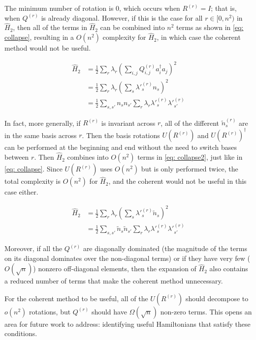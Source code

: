 The minimum number of rotation is $0$, which occurs when $R^{(r)} = I$; that is, when $Q^{(r)}$ is already diagonal. However, if this is the case for all $r \in [0, n^2)$ in $\hat{H}_2$, then all of the terms in $\hat{H}_2$ can be combined into $n^2$ terms as shown in \eqref{eq: collapse}, resulting in a $O(n^2)$ complexity for $\hat{H}_2$, in which case the coherent method would not be useful.

\begin{equation}
    \begin{split}
        \hat{H}_2 &= \frac{1}{2}\sum_r\lambda_r\left(\sum_{i,j} Q^{(r)}_{i, j}a^\dag_ia_j\right)^2 \\
        &= \frac{1}{2}\sum_r\lambda_r(\sum_{s} \lambda'^{(r)}_sn_s)^2 \\
        &= \frac{1}{2}\sum_{s, s'} n_sn_{s'}\sum_r\lambda_r\lambda'^{(r)}_s\lambda'^{(r)}_{s'}
    \end{split}
    \label{eq: collapse}
\end{equation}

In fact, more generally, if $R^{(r)}$ is invariant across $r$, all of the different $\tilde{n}^{(r)}_s$ are in the same basis across $r$. Then the basis rotations $U(R^{(r)})$ and $U(R^{(r)})^\dag$ can be performed at the beginning and end without the need to switch bases between $r$. Then $\hat{H}_2$ combines into $O(n^2)$ terms in \eqref{eq: collapse2}, just like in \eqref{eq: collapse}. Since $U(R^{(r)})$ uses $O(n^2)$ but is only performed twice, the total complexity is $O(n^2)$ for $\hat{H}_2$, and the coherent would not be useful in this case either.

\begin{equation}
    \begin{split}
        \hat{H}_2 &= \frac{1}{2}\sum_r\lambda_r\left(\sum_s \lambda'^{(r)}_s \tilde{n}_s\right)^2 \\
        &= \frac{1}{2}\sum_{s, s'} \tilde{n}_s\tilde{n}_{s'}\sum_r\lambda_r\lambda'^{(r)}_s\lambda'^{(r)}_{s'}
    \end{split}
    \label{eq: collapse2}
\end{equation}

Moreover, if all the $Q^{(r)}$ are diagonally dominated (the magnitude of the terms on its diagonal dominates over the non-diagonal terms) or if they have very few ($O(\sqrt{n})$) nonzero off-diagonal elements, then the expansion of $\hat{H}_2$ also contains a reduced number of terms that make the coherent method unnecessary.

For the coherent method to be useful, all of the $U(R^{(r)})$ should decompose to $o(n^2)$ rotations, but $Q^{(r)}$ should have $\Omega(\sqrt{n})$ non-zero terms. This opens an area for future work to address: identifying useful Hamiltonians that satisfy these conditions.

